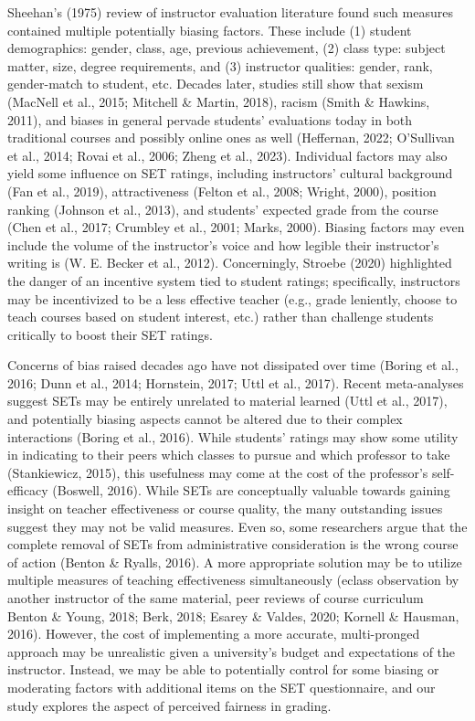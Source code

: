 \documentclass[
  man]{apa7}
\begin{document}
Sheehan's (1975) review of instructor evaluation literature found such measures contained multiple potentially biasing factors. These include (1) student demographics: gender, class, age,
previous achievement, (2) class type: subject matter, size, degree
requirements, and (3) instructor qualities: gender, rank, gender-match to
student, etc. Decades later, studies still show that sexism
(MacNell et al., 2015; Mitchell \& Martin, 2018), racism (Smith \& Hawkins, 2011), and biases in general
pervade students' evaluations today in both traditional courses and
possibly online ones as well (Heffernan, 2022; O'Sullivan et al., 2014; Rovai et al., 2006; Zheng et al., 2023). Individual factors may also yield some influence on SET
ratings, including instructors' cultural background (Fan et al., 2019),
attractiveness (Felton et al., 2008; Wright, 2000), position ranking
(Johnson et al., 2013), and students' expected grade from the course (Chen et al., 2017; Crumbley et al., 2001; Marks, 2000). Biasing factors may even include the volume
of the instructor's voice and how legible their instructor's writing is
(W. E. Becker et al., 2012). Concerningly, Stroebe (2020) highlighted the danger of an incentive system tied to student ratings; specifically, instructors may be incentivized to be a less effective teacher (e.g., grade leniently, choose to teach courses based on student interest, etc.) rather than challenge students critically to boost their SET ratings.

Concerns of bias raised decades ago have not dissipated over time (Boring et al., 2016; Dunn et al., 2014; Hornstein, 2017; Uttl et al., 2017). Recent meta-analyses suggest SETs may be
entirely unrelated to material learned (Uttl et al., 2017), and potentially
biasing aspects cannot be altered due to their complex interactions
(Boring et al., 2016). While students' ratings may show some utility in
indicating to their peers which classes to pursue and which professor to
take (Stankiewicz, 2015), this usefulness may come at the cost of the professor's
self-efficacy (Boswell, 2016). While SETs are conceptually valuable
towards gaining insight on teacher effectiveness or course quality, the
many outstanding issues suggest they may not be valid measures. Even so,
some researchers argue that the complete removal of SETs from
administrative consideration is the wrong course of action
(Benton \& Ryalls, 2016). A more appropriate solution may be to utilize multiple
measures of teaching effectiveness simultaneously (eclass observation by
another instructor of the same material, peer reviews of course curriculum Benton \& Young, 2018; Berk, 2018; Esarey \& Valdes, 2020; Kornell \& Hausman, 2016). However, the cost of implementing
a more accurate, multi-pronged approach may be unrealistic given a
university's budget and expectations of the instructor. Instead, we may be able to potentially control for some biasing or moderating factors with additional items on the SET questionnaire, and our study explores the aspect of perceived fairness in grading.
\end{document}
